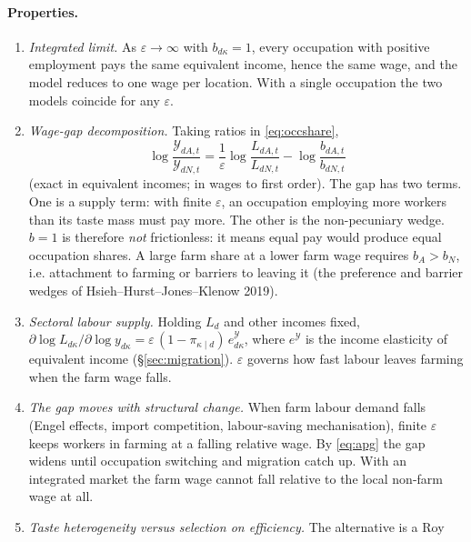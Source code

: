 \documentclass[11pt]{article}
\begin{document}
\paragraph{Properties.}
\begin{enumerate}[leftmargin=1.5em]
\item \emph{Integrated limit.} As $\varepsilon\to\infty$ with $b_{d\kappa}=1$, every
      occupation with positive employment pays the same equivalent income, hence the same
      wage, and the model reduces to one wage per location. With a single occupation the two
      models coincide for any $\varepsilon$.
\item \emph{Wage-gap decomposition.} Taking ratios in \eqref{eq:occshare},
      \begin{equation}
        \log\frac{\mathcal{Y}_{dA,t}}{\mathcal{Y}_{dN,t}}
        =\frac{1}{\varepsilon}\log\frac{L_{dA,t}}{L_{dN,t}}-\log\frac{b_{dA,t}}{b_{dN,t}}
        \label{eq:gapdecomp}
      \end{equation}
      (exact in equivalent incomes; in wages to first order). The gap has two terms. One is a
      supply term: with finite $\varepsilon$, an occupation employing more workers than its
      taste mass must pay more. The other is the non-pecuniary wedge. $b=1$ is therefore
      \emph{not} frictionless: it means equal pay would produce equal occupation shares. A
      large farm share at a lower farm wage requires $b_{A}>b_{N}$, i.e. attachment to
      farming or barriers to leaving it (the preference and barrier wedges of
      Hsieh--Hurst--Jones--Klenow 2019).
\item \emph{Sectoral labour supply.} Holding $L_{d}$ and other incomes fixed,
      $\partial\log L_{d\kappa}/\partial\log y_{d\kappa}=\varepsilon\,(1-\pi_{\kappa\mid d})\,e^{\mathcal{Y}}_{d\kappa}$,
      where $e^{\mathcal{Y}}$ is the income elasticity of equivalent income (\S\ref{sec:migration}).
      $\varepsilon$ governs how fast labour leaves farming when the farm wage falls.
\item \emph{The gap moves with structural change.} When farm labour demand falls (Engel
      effects, import competition, labour-saving mechanisation), finite $\varepsilon$ keeps
      workers in farming at a falling relative wage. By \eqref{eq:apg} the gap widens until
      occupation switching and migration catch up. With an integrated market the farm wage
      cannot fall relative to the local non-farm wage at all.
\item \emph{Taste heterogeneity versus selection on efficiency.} The alternative is a Roy

\end{enumerate}
\end{document}

